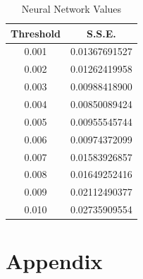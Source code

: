 \documentclass[a4paper, twocolumn]{article}
\begin{document}
    \begin{table}[h!]
        \begin{center}
            \begin{tabular}{cc}
                \toprule
                \textbf{Threshold} & \textbf{S.S.E.} \\
                \midrule
                0.001 & 0.01367691527 \\
                0.002 & 0.01262419958 \\
                0.003 & 0.00988418900 \\
                0.004 & 0.00850089424 \\
                0.005 & 0.00955545744 \\
                0.006 & 0.00974372099 \\
                0.007 & 0.01583926857 \\
                0.008 & 0.01649252416 \\
                0.009 & 0.02112490377 \\
                0.010 & 0.02735909554 \\
                \bottomrule
            \end{tabular}
        \end{center}
        \caption{Neural Network Values}
        \label{tab:forecast}
    \end{table}

    \nocite{*}
    
    

    \onecolumn \appendix
    \section*{Appendix}

    
\end{document}
